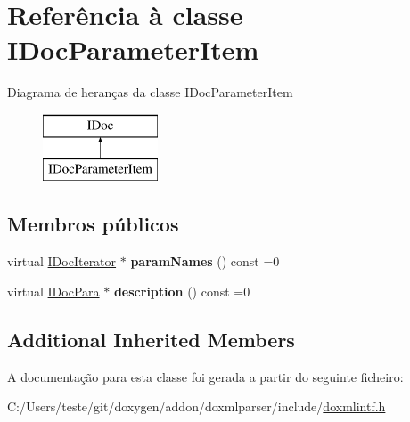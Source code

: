 \hypertarget{class_i_doc_parameter_item}{\section{Referência à classe I\-Doc\-Parameter\-Item}
\label{class_i_doc_parameter_item}
}
Diagrama de heranças da classe I\-Doc\-Parameter\-Item\begin{figure}[H]
\begin{center}
\leavevmode
\includegraphics[height=2.000000cm]{class_i_doc_parameter_item}
\end{center}
\end{figure}
\subsection*{Membros públicos}
\begin{DoxyCompactItemize}
\item 
\hypertarget{class_i_doc_parameter_item_ae1a9d4aefdfea801289588267fc3ae67}{virtual \hyperlink{class_i_doc_iterator}{I\-Doc\-Iterator} $\ast$ {\bfseries param\-Names} () const =0}\label{class_i_doc_parameter_item_ae1a9d4aefdfea801289588267fc3ae67}

\item 
\hypertarget{class_i_doc_parameter_item_a66d14328150513d657e222a22970e2e5}{virtual \hyperlink{class_i_doc_para}{I\-Doc\-Para} $\ast$ {\bfseries description} () const =0}\label{class_i_doc_parameter_item_a66d14328150513d657e222a22970e2e5}

\end{DoxyCompactItemize}
\subsection*{Additional Inherited Members}


A documentação para esta classe foi gerada a partir do seguinte ficheiro\-:\begin{DoxyCompactItemize}
\item 
C\-:/\-Users/teste/git/doxygen/addon/doxmlparser/include/\hyperlink{include_2doxmlintf_8h}{doxmlintf.\-h}\end{DoxyCompactItemize}
